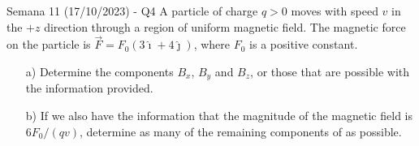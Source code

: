 \begin{frame}{Semana 11 (17/10/2023) - Q4}
    A particle of charge $q>0$ moves with speed $v$ in the $+z$ direction through a region of uniform magnetic field. The magnetic force on the particle is $\vec{F}=F_0(3\hat{\imath}+4\hat{\jmath})$, where $F_0$ is a positive constant.
\begin{itemize}
     \item[a)] Determine the components $B_x$, $B_y$ and $B_z$, or those that are possible with the information provided.
     \item[b)] If we also have the information that the magnitude of the magnetic field is $6F_0/(qv)$, determine as many of the remaining components of as possible.
\end{itemize}
\end{frame}